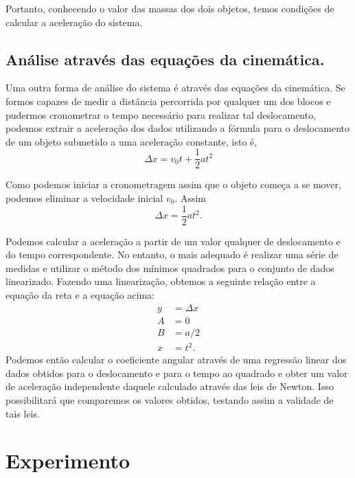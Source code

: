 Portanto, conhecendo o valor das massas dos dois objetos, temos condições de calcular a aceleração do sistema.

\subsection{Análise através das equações da cinemática.}

Uma outra forma de análise do sistema é através das equações da cinemática. Se formos capazes de medir a distância percorrida por qualquer um dos blocos e pudermos cronometrar o tempo necessário para realizar tal deslocamento, podemos extrair a aceleração dos dados utilizando a fórmula para o deslocamento de um objeto submetido a uma aceleração constante, isto é,
	\begin{equation}
		\Delta x = v_0 t + \frac{1}{2} at^2
	\end{equation}

Como podemos iniciar a cronometragem assim que o objeto começa a se mover, podemos eliminar a velocidade inicial $v_0$. Assim
\begin{equation}
	\Delta x = \frac{1}{2} at^2.
\end{equation}

Podemos calcular a aceleração a partir de um valor qualquer de deslocamento e do tempo correspondente. No entanto, o mais adequado é realizar uma série de medidas e utilizar o método dos mínimos quadrados para o conjunto de dados linearizado. Fazendo uma linearização, obtemos a seguinte relação entre a equação da reta e a equação acima:
\begin{align}
	y &= \Delta x \\
	A &= 0 \\
	B &= a/2 \\
	x &= t^2.
\end{align}
%
Podemos então calcular o coeficiente angular através de uma regressão linear dos dados obtidos para o deslocamento e para o tempo ao quadrado e obter um valor de aceleração independente daquele calculado através das leis de Newton. Isso possibilitará que comparemos os valores obtidos, testando assim a validade de tais leis.

\section{Experimento}

